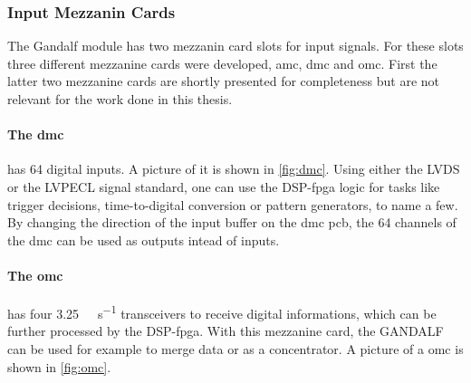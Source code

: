 \subsubsection{Input Mezzanin Cards}
The Gandalf module has two mezzanin card slots for input signals.
For these slots three different mezzanine cards were developed, \ac{amc}, \ac{dmc} and \ac{omc}.
First the latter two mezzanine cards are shortly presented for completeness but are not relevant for the work done in this thesis.

\paragraph{The \ac{dmc}} has 64 digital inputs. 
A picture of it is shown in \autoref{fig:dmc}.
Using either the LVDS or the LVPECL signal standard, one can use the DSP-\ac{fpga} logic for tasks like trigger decisions, time-to-digital conversion or pattern generators, to name a few.
By changing the direction of the input buffer on the \ac{dmc} \ac{pcb}, the 64 channels of the \ac{dmc} can be used as outputs intead of inputs.

\paragraph{The \ac{omc}} has four \SI{3.25}{\giga\bit\per\second} transceivers to receive digital informations, which can be further processed by the DSP-\ac{fpga}.
With this mezzanine card, the GANDALF can be used for example to merge data or as a concentrator.
A picture of a \ac{omc} is shown in \autoref{fig:omc}.

